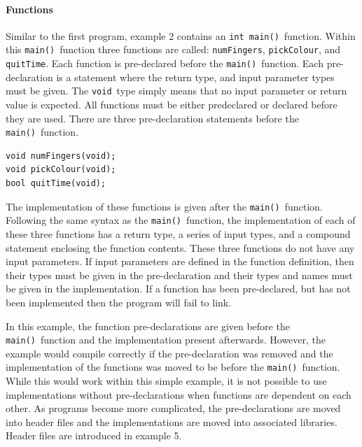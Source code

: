\documentclass[11pt]{scrartcl}
\def\main{\texttt{main()}}
\def\intmain{\texttt{int main()}}
\def\void{\texttt{void}}
\begin{document}
\paragraph{Functions}
Similar to the first program, example 2 contains an \intmain\ function.  Within this \main\ function three functions are called: \texttt{numFingers}, \texttt{pickColour}, and \texttt{quitTime}.  Each function is pre-declared before the \main\ function.  Each pre-declaration is a statement where the return type, and input parameter types must be given.  The \void\ type simply means that no input parameter or return value is expected.  All functions must be either predeclared or declared before they are used.  There are three pre-declaration statements before the \main\ function.
\begin{lstlisting}
void numFingers(void);
void pickColour(void);
bool quitTime(void);
\end{lstlisting}
The implementation of these functions is given after the \main\ function.  Following the same syntax as the \main\ function, the implementation of each of these three functions has a return type, a series of input types, and a compound statement enclosing the function contents.  These three functions do not have any input parameters.  If input parameters are defined in the function definition, then their types must be given in the pre-declaration and their types and names must be given in the implementation.  If a function has been pre-declared, but has not been implemented then the program will fail to link.

In this example, the function pre-declarations are given before the \main\ function and the implementation present afterwards.  However, the example would compile correctly if the pre-declaration was removed and the implementation of the functions was moved to be before the \main\ function.  While this would work within this simple example, it is not possible to use implementations without pre-declarations when functions are dependent on each other.  As programs become more complicated, the pre-declarations are moved into header files and the implementations are moved into associated libraries.  Header files are introduced in example 5.
\end{document}
